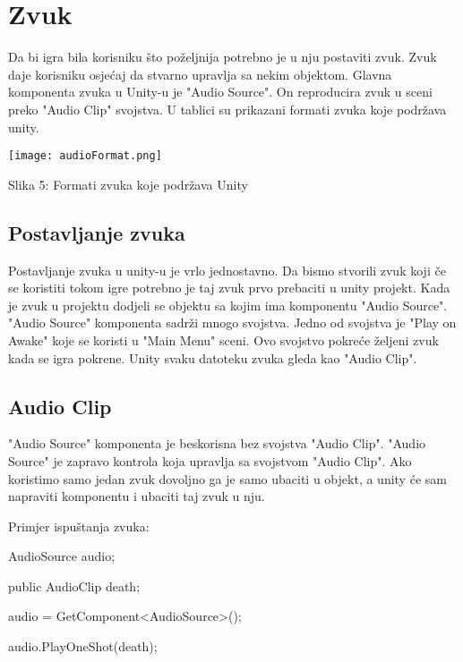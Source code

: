 \section{Zvuk}

Da bi igra bila korisniku što poželjnija potrebno je u nju postaviti zvuk. Zvuk daje korisniku osjećaj da stvarno upravlja sa nekim objektom. Glavna komponenta zvuka u Unity-u je "Audio Source". On reproducira zvuk u sceni preko "Audio Clip" svojstva. U tablici su prikazani formati zvuka koje podržava unity.  


\begin{center}
	\texttt{[image: audioFormat.png]}
	
	
	Slika 5: Formati zvuka koje podržava Unity
\end{center}


\subsection{Postavljanje zvuka}
Postavljanje zvuka u unity-u je vrlo jednostavno. Da bismo stvorili zvuk koji če se koristiti tokom igre potrebno je taj zvuk prvo prebaciti u unity projekt. Kada je zvuk u projektu dodjeli se objektu sa kojim ima komponentu "Audio Source". "Audio Source" komponenta sadrži mnogo svojstva. Jedno od svojstva je "Play on Awake" koje se koristi u "Main Menu" sceni. Ovo svojstvo pokreće željeni zvuk kada se igra pokrene. Unity svaku datoteku zvuka gleda kao "Audio Clip".

\subsection{Audio Clip}
"Audio Source" komponenta je beskorisna bez svojstva "Audio Clip". "Audio Source" je zapravo kontrola koja upravlja sa svojstvom "Audio Clip". Ako koristimo samo jedan zvuk dovoljno ga je samo ubaciti u objekt, a unity će sam napraviti komponentu i ubaciti taj zvuk u nju.

Primjer ispuštanja zvuka:

AudioSource audio;

public AudioClip death;

audio = GetComponent<AudioSource>();

audio.PlayOneShot(death);


